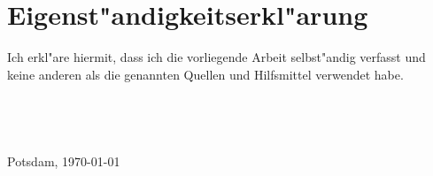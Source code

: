 \chapter*{Eigenst"andigkeitserkl"arung}
Ich erkl"are hiermit, dass ich die vorliegende Arbeit selbst"andig verfasst und keine anderen als die genannten Quellen und Hilfsmittel verwendet habe.
\\
\\
\\
\\
\\
Potsdam, \today
\\
\\
\\
\\
\AUTHOR
